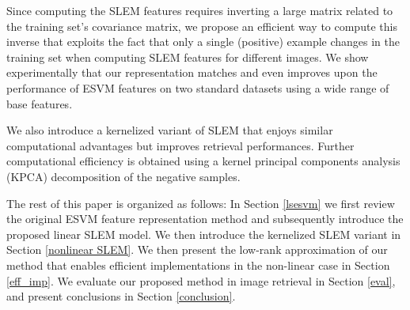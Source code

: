 Since computing the SLEM features requires inverting a large matrix related to the training set's covariance matrix, we propose an efficient way to compute this inverse that exploits the fact that only a single (positive) example changes in the training set when computing SLEM features for different images. We show experimentally that our representation matches and even improves upon the performance of ESVM features on two standard datasets using a wide range of base features.

We also introduce a kernelized variant of SLEM that enjoys similar computational advantages but improves retrieval performances. Further computational efficiency is obtained using a kernel principal components analysis (KPCA) decomposition of the negative samples.

The rest of this paper is organized as follows:
In Section \ref{lsesvm} we first review the original ESVM feature representation method and subsequently introduce the proposed linear SLEM model. We then introduce the kernelized SLEM variant in Section \ref{nonlinear SLEM}. We then present the low-rank approximation of our method that enables efficient implementations in the non-linear case in Section \ref{eff_imp}. We evaluate our proposed method in image retrieval in Section \ref{eval}, and present conclusions in Section \ref{conclusion}.









